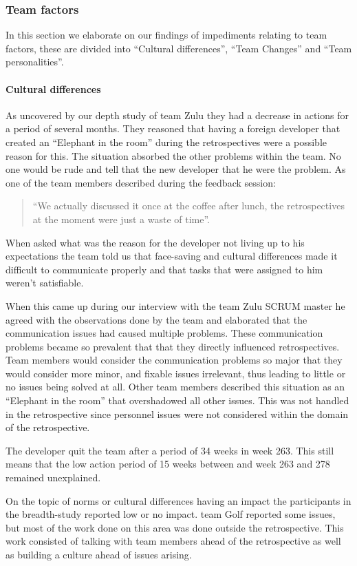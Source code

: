 \subsubsection{Team factors}
In this section we elaborate on our findings of impediments relating to team factors, these are divided into ``Cultural differences'', ``Team Changes'' and ``Team personalities''.

\paragraph{Cultural differences}
\label{results-elephant-in-the-room} 
As uncovered by our depth study of team Zulu they had a decrease in actions for a period of several months. They reasoned that having a foreign developer that created an ``Elephant in the room'' during the retrospectives were a possible reason for this. The situation absorbed the other problems within the team. No one would be rude and tell that the new developer that he were the problem. As one of the team members described during the feedback session: 
\begin{quote}
``We actually discussed it once at the coffee after lunch, the retrospectives at the moment were just a waste of time''. 
\end{quote}
When asked what was the reason for the developer not living up to his expectations the team told us that face-saving and cultural differences made it difficult to communicate properly and that tasks that were assigned to him weren't satisfiable. 

When this came up during our interview with the team Zulu SCRUM master he agreed with the observations done by the team and elaborated that the communication issues had caused multiple problems.  These communication problems became so prevalent that that they directly influenced retrospectives. Team members would consider the communication problems so major that they would consider more minor, and fixable issues irrelevant, thus leading to little or no issues being solved at all.  Other team members described this situation as an ``Elephant in the room'' that overshadowed all other issues. This was not handled in the retrospective since personnel issues were not considered within the domain of the retrospective.

The developer quit the team after a period of 34 weeks in week 263. This still means that the low action period of 15 weeks between and week 263 and 278 remained unexplained. 


On the topic of norms or cultural differences having an impact the participants in the breadth-study reported low or no impact. team Golf reported some issues, but most of the work done on this area was done outside the retrospective. This work consisted of talking with team members ahead of the retrospective as well as building a culture ahead of issues arising. 


